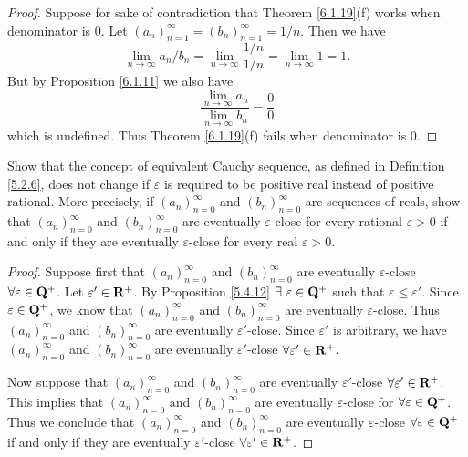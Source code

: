 \begin{proof}
    Suppose for sake of contradiction that Theorem \ref{6.1.19}(f) works when denominator is \(0\).
    Let \((a_n)_{n = 1}^\infty = (b_n)_{n = 1}^\infty = 1 / n\).
    Then we have
    \[
        \lim_{n \to \infty} a_n / b_n = \lim_{n \to \infty} \frac{1 / n}{1 / n} = \lim_{n \to \infty} 1 = 1.
    \]
    But by Proposition \ref{6.1.11} we also have
    \[
        \frac{\lim_{n \to \infty} a_n}{\lim_{n \to \infty} b_n} = \frac{0}{0}
    \]
    which is undefined.
    Thus Theorem \ref{6.1.19}(f) fails when denominator is \(0\).
\end{proof}

\begin{exercise}\label{ex 6.1.10}
    Show that the concept of equivalent Cauchy sequence, as defined in Definition \ref{5.2.6}, does not change if \(\varepsilon\) is required to be positive real instead of positive rational.
    More precisely, if \((a_n)_{n = 0}^\infty\) and \((b_n)_{n = 0}^\infty\) are sequences of reals, show that \((a_n)_{n = 0}^\infty\) and \((b_n)_{n = 0}^\infty\) are eventually \(\varepsilon\)-close for every rational \(\varepsilon > 0\) if and only if they are eventually \(\varepsilon\)-close for every real \(\varepsilon > 0\).
\end{exercise}

\begin{proof}
    Suppose first that \((a_n)_{n = 0}^\infty\) and \((b_n)_{n = 0}^\infty\) are eventually \(\varepsilon\)-close \(\forall \varepsilon \in \mathbf{Q}^+\).
    Let \(\varepsilon' \in \mathbf{R}^+\).
    By Proposition \ref{5.4.12} \(\exists\ \varepsilon \in \Q^+\) such that \(\varepsilon \leq \varepsilon'\).
    Since \(\varepsilon \in \mathbf{Q}^+\), we know that \((a_n)_{n = 0}^\infty\) and \((b_n)_{n = 0}^\infty\) are eventually \(\varepsilon\)-close.
    Thus \((a_n)_{n = 0}^\infty\) and \((b_n)_{n = 0}^\infty\) are eventually \(\varepsilon'\)-close.
    Since \(\varepsilon'\) is arbitrary, we have \((a_n)_{n = 0}^\infty\) and \((b_n)_{n = 0}^\infty\) are eventually \(\varepsilon'\)-close \(\forall \varepsilon' \in \mathbf{R}^+\).

    Now suppose that \((a_n)_{n = 0}^\infty\) and \((b_n)_{n = 0}^\infty\) are eventually \(\varepsilon'\)-close \(\forall \varepsilon' \in \mathbf{R}^+\).
    This implies that \((a_n)_{n = 0}^\infty\) and \((b_n)_{n = 0}^\infty\) are eventually \(\varepsilon\)-close for \(\forall \varepsilon \in \mathbf{Q}^+\).
    Thus we conclude that \((a_n)_{n = 0}^\infty\) and \((b_n)_{n = 0}^\infty\) are eventually \(\varepsilon\)-close \(\forall \varepsilon \in \mathbf{Q}^+\) if and only if they are eventually \(\varepsilon'\)-close \(\forall \varepsilon' \in \mathbf{R}^+\).
\end{proof}